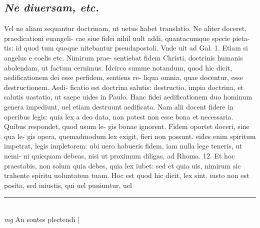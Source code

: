 \documentclass{article}
\begin{document}
\begin{pages}
\subsection*{\textit{Ne diuersam, etc. }}\pstart Vel ne aliam sequantur doctrinam, ut uetus habet translatio. Ne aliter doceret, praedicationi euangeli- cae siue fidei nihil uult addi, quantacumque  specie pieta- tis: id quod tum quoque  nitebantur pseudapostoli. Vnde uit ad Gal. 1. Etiam si angelus e coelis etc. Nimirum prae- sentiebat fidem Christi, doctrinis humanis abolendam, ut factum cernimus. Idcirco summe notandum, quod hic dicit, aedificationem dei esse perfidem, sentiens re- liqua omnia, quae docentur, esse destructionem. Aedi- ficatio est doctrina salutis: destructio, impia doctrina, et salutis uastatio, ut saepe uides in Paulo. Hanc fidei aedificationem duo hominum genera impediunt, uel etiam destruunt aedificata. Nam alii docent fidere in operibus legis: quia lex a deo data, non potest non esse bona et necessaria. Quibus respondet, quod usum le- gis bonae ignorent. Fidem oportet doceri, sine qua le- gis opera, quemadmodum lex exigit, fieri non possunt. eides enim spiritum impetrat, legis impletorem: ubi uero habueris fidem, iam nulla lege teneris, ut nemi- ni quicquam debeas, nisi ut proximum diligas, ad Rhoma. 12. Et hoc praestabis, non solum quia debes, quia lex iubet: sed et quia uis, nimirum sic trahente spiritu uoluntatem tuam. Hoc est quod hic dicit, lex sint. iusto non est posita, sed iniustis, qui uel puniuntur, uel  \pend
\vspace{0.5cm}\noindent
\vspace{0.2cm}\rule{1cm}{0.2pt}\\ 
\hspace{0.2cm}\textit{mg}
\footnotesize An sontes plectendi 
\normalsize| 

\end{pages}
\end{document}
